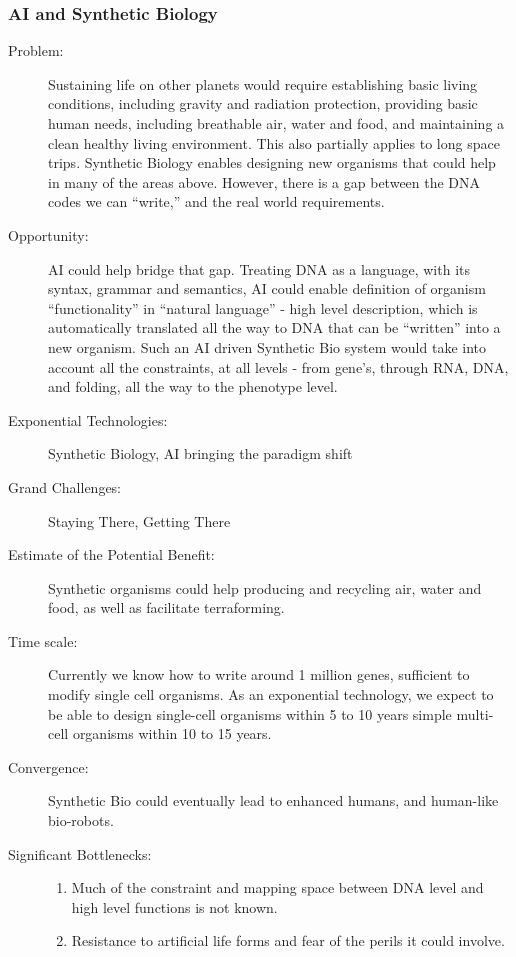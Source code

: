 \subsubsection{AI and Synthetic Biology}
\label{aisyn}
\begin{description}
\item[Problem:]
Sustaining life on other planets  would require establishing basic living conditions, including gravity  and radiation protection, providing basic human needs, including  breathable air, water and food, and maintaining a clean healthy living  environment. This also partially 
applies  to long space trips. Synthetic Biology enables designing new organisms  that could help in many of the areas above. However, there is a gap  between the DNA codes we can ``write,'' and the real world requirements.
 
 \item[Opportunity:] AI could help bridge that gap.  Treating DNA as a language, with its  syntax, grammar and semantics, AI could enable definition of organism  ``functionality'' in ``natural language'' - high level description, which is  automatically translated all the way to DNA that can be ``written'' into a  new organism. Such an AI driven Synthetic Bio system would take into  account all the constraints, at all levels - from gene's, through RNA,  DNA, and folding, all the way to the
 phenotype  level. 
 
 \item[Exponential  Technologies:]  Synthetic Biology, AI bringing the paradigm shift
 
 \item[Grand Challenges:] Staying There, Getting There
 
 \item[Estimate of the Potential  Benefit:] Synthetic organisms could help  producing and recycling air, water and food, as well as facilitate  terraforming.

 \item[Time scale:] Currently we know how to write  around 1 million genes, 
sufficient  to modify single cell organisms. As an exponential technology, we  expect to be able to design single-cell organisms within 5 to 10 years  simple multi-cell organisms within 10 to 15 years. 
 
\item[Convergence:] Synthetic Bio could eventually  lead to enhanced humans, and human-like bio-robots.

\item[Significant Bottlenecks:]
\hfill\begin{enumerate}
\item Much of the constraint and mapping  space between DNA level and high
 level  functions is not known.
 \item Resistance to artificial life  forms and fear of the perils it could involve.
 \end{enumerate}
 \end{description}
 

